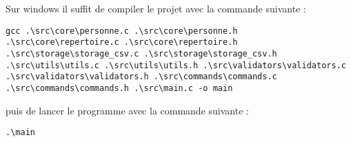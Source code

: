\documentclass[12pt]{report}
\begin{document}
Sur windows il suffit de compiler le projet avec la commande suivante :

\begin{verbatim}
gcc .\src\core\personne.c .\src\core\personne.h .\src\core\repertoire.c .\src\core\repertoire.h .\src\storage\storage_csv.c .\src\storage\storage_csv.h .\src\utils\utils.c .\src\utils\utils.h .\src\validators\validators.c .\src\validators\validators.h .\src\commands\commands.c .\src\commands\commands.h .\src\main.c -o main
\end{verbatim}

puis de lancer le programme avec la commande suivante :
\begin{verbatim}
.\main
\end{verbatim}
\end{document}
